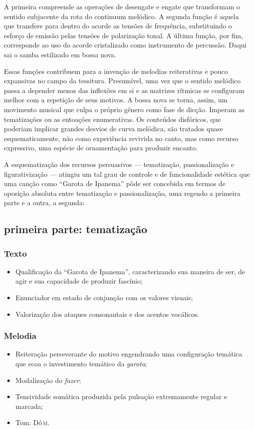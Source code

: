 A primeira compreende as operações de desengate e engate que transformam
o sentido subjacente da rota do continuum melódico. A segunda função é
aquela que transfere para dentro do acorde as tensões de frequência,
substituindo o esforço de emissão pelas tensões de polarização tonal. A
última função, por fim, corresponde ao uso do acorde cristalizado como
instrumento de percussão. Daqui sai o samba estilizado em bossa nova.

Essas funções contribuem para a invenção de melodias reiterativas e
pouco expansivas no campo da tessitura. Presumível, uma vez que o
sentido melódico passa a depender menos das inflexões em si e as
matrizes rítmicas se configuram melhor com a repetição de seus motivos.
A bossa nova se torna, assim, um movimento musical que culpa o próprio
gênero como fase de dicção. Imperam as tematizações ou as entoações
enumerativas. Os conteúdos disfóricos, que poderiam implicar grandes
desvios de curva melódica, são tratados quase esquematicamente, não como
experiência revivida no canto, mas como recurso expressivo, uma espécie
de ornamentação para produzir encanto.

A esquematização dos recursos persuasivos --- tematização, passionalização
e figurativização --- atingiu um tal grau de controle e de funcionalidade
estética que uma canção como ``Garota de Ipanema'' pôde ser concebida em
termos de oposição absoluta entre tematização e passionalização, uma
regendo a primeira parte e a outra, a segunda:

\subsection{primeira parte: tematização}


\subsubsection{Texto} 
\begin{itemize}
\item Qualificação da ``Garota de Ipanema'', caracterizando sua maneira de ser, de
agir e sua capacidade de produzir fascínio;
\item Enunciador em estado de conjunção com os valores visuais;
\item Valorização dos ataques consonantais e dos acentos vocálicos.
\end{itemize}

\subsubsection{Melodia}
\begin{itemize}
\item Reiteração perseverante do motivo engendrando uma configuração temática
que ecoa o investimento temático da \textit{garota};
\item Modalização do \textit{fazer};
\item Tensividade somática produzida pela pulsação extremamente regular e
marcada;
\item Tom: Dó\,\textsc{m}.
\end{itemize}

